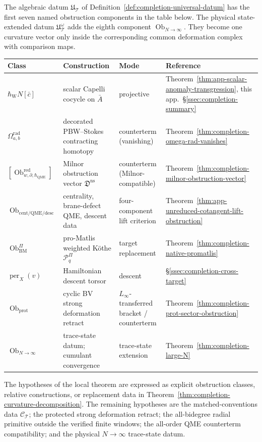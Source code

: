 \begin{thm}
\label{thm:completion-curvature-decomposition}
The algebraic datum \(\mathfrak U_{\mathcal T}\) of
Definition~\ref{def:completion-universal-datum} has the first seven
named obstruction components in the table below.  The physical
state-extended datum \(\mathfrak U^\omega_{\mathcal T}\) adds the
eighth component \(\operatorname{Ob}_{N\to\infty}\).  They become one
curvature vector only inside the corresponding common deformation
complex with comparison maps.
\begin{center}
\small
\renewcommand{\arraystretch}{1.25}
\begin{tabularx}{\textwidth}{@{}>{\raggedright\arraybackslash}p{}
>{\raggedright\arraybackslash}X
>{\raggedright\arraybackslash}p{}
>{\raggedright\arraybackslash}p{}@{}}
Class & Construction & Mode & Reference\\\hline
\(\hbar_{\mathrm{W}}N[\bar c]\)
 & scalar Capelli cocycle on \(\bar A\)
 & projective
 & Theorem~\ref{thm:app-scalar-anomaly-transgression}, this app.~\S\ref{ssec:completion-summary}\\
\(\Omega^{\mathrm{rad}}_{a,b}\)
 & decorated PBW--Stokes contracting homotopy
 & counterterm (vanishing)
 & Theorem~\ref{thm:completion-omega-rad-vanishes}\\
\(\scriptstyle [\operatorname{Ob}^{\mathrm{red}}_{w,\partial,\hbar_{\mathrm{QME}}}]\)
 & Milnor obstruction vector \(\mathfrak D^{\mathrm{ns}}\)
 & counterterm (Milnor-compatible)
 & Theorem~\ref{thm:completion-milnor-obstruction-vector}\\
\(\operatorname{Ob}_{\mathrm{cent/QME/desc}}\)
 & centrality, brane-defect QME, descent data
 & four-component lift criterion
 & Theorem~\ref{thm:app-unreduced-cotangent-lift-obstruction}\\
\(\operatorname{Ob}^\Pi_{\mathrm{BM}}\)
 & pro-Matlis weighted K\"othe \(\mathcal P^\Pi_q\)
 & target replacement
 & Theorem~\ref{thm:completion-native-promatlis}\\
\(\operatorname{per}_X(v)\)
 & Hamiltonian descent torsor
 & descent
 & \S\ref{ssec:completion-cross-target}\\
\(\operatorname{Ob}_{\mathrm{prot}}\)
 & cyclic BV strong deformation retract
 & \(L_\infty\)-transferred bracket / counterterm
 & Theorem~\ref{thm:completion-prot-sector-obstruction}\\
\(\operatorname{Ob}_{N\to\infty}\)
 & trace-state datum; cumulant convergence
 & trace-state extension
 & Theorem~\ref{thm:completion-large-N}
\end{tabularx}
\end{center}
The hypotheses of the local theorem are expressed as explicit
obstruction classes, relative constructions, or replacement
data in Theorem~\ref{thm:completion-curvature-decomposition}.  The
remaining hypotheses are the matched-conventions data
\(\mathcal C_{\mathcal T}\); the protected strong deformation retract;
the all-bidegree radial primitive outside the verified finite windows;
the all-order QME counterterm compatibility; and the physical
\(N\to\infty\) trace-state datum.
\end{thm}

